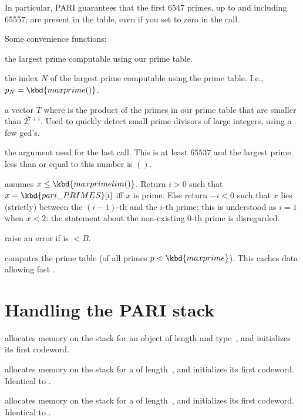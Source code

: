 In particular, PARI guarantees that the first 6547 primes, up to and
including 65557, are present in the table, even if you set  to
zero in the  call.

\noindent Some convenience functions:

 the largest prime computable using our prime table.

 the index $N$ of the largest prime computable using
the prime table. I.e., $p_N = \kbd{maxprime()}$.

 a vector $T$ where  is the product of the
primes in our prime table that are smaller than $2^{7+i}$. Used to quickly
detect small prime divisors of large integers, using a few gcd's.

 the argument used for the last
call. This is at least $65537$ and the largest prime
less than or equal to this number is $()$.

 assumes $x \leq \kbd{maxprimelim()}$. Return
$i > 0$ such that $x = \kbd{pari\_PRIMES}[i]$ iff $x$ is prime. Else
return $-i < 0$ such that $x$ lies (strictly) between the $(i-1)$-th and
the $i$-th prime; this is understood as $i = 1$ when $x < 2$: the statement
about the non-existing $0$-th prime is disregarded.

 raise an error if  is $< B$.

 computes the prime table
 (of all primes $p < \kbd{maxprime}$).
This caches data allowing fast .

\section{Handling the PARI stack}


 allocates memory on the stack for
an object of length  and type~, and initializes its first
codeword.

 allocates memory on the stack for a 
of length~, and initializes its first codeword. Identical to
.

 allocates memory on the stack for a 
of length~, and initializes its first codeword. Identical to
.

